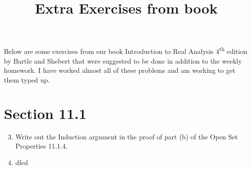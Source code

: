 \documentclass[12pt]{article}
\title{Extra Exercises from book}
\begin{document}
\maketitle

Below are some exercises from our book Introduction to Real Analysis 4\textsuperscript{th} edition by Bartle and Shebert that were suggested to be done in addition to the weekly homework. I have worked almost all of these problems and am working to get them typed up.

\section*{Section 11.1}

\begin{enumerate}

\setcounter{enumi}{2}

\item Write out the Induction argument in the proof of part (b) of the Open Set Properties 11.1.4.

\setcounter{enumi}{4}

\item dfed
\end{enumerate}
\end{document}
